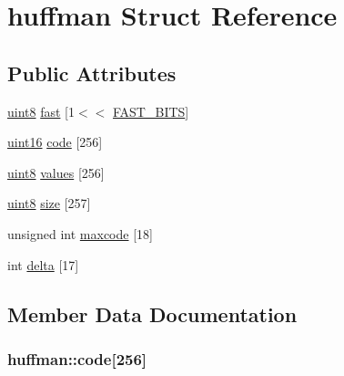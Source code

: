 \hypertarget{structhuffman}{}\section{huffman Struct Reference}
\label{structhuffman}
\subsection*{Public Attributes}
\begin{DoxyCompactItemize}
\item 
\hyperlink{stb__image_8c_adde6aaee8457bee49c2a92621fe22b79}{uint8} \hyperlink{structhuffman_a9dbb29a8ed724a32f502d9595510ddc2}{fast} \mbox{[}1$<$$<$ \hyperlink{stb__image_8c_add78822c51f4692289f2ce174bdf82b0}{F\+A\+S\+T\+\_\+\+B\+I\+T\+S}\mbox{]}
\item 
\hyperlink{stb__image_8c_a05f6b0ae8f6a6e135b0e290c25fe0e4e}{uint16} \hyperlink{structhuffman_a9925018a95d5a2122cd732561fa0fa64}{code} \mbox{[}256\mbox{]}
\item 
\hyperlink{stb__image_8c_adde6aaee8457bee49c2a92621fe22b79}{uint8} \hyperlink{structhuffman_a313d78cf23f40b314c25681ff2a6224b}{values} \mbox{[}256\mbox{]}
\item 
\hyperlink{stb__image_8c_adde6aaee8457bee49c2a92621fe22b79}{uint8} \hyperlink{structhuffman_afdb0fbcf25aec42ba30b0d0e2453a057}{size} \mbox{[}257\mbox{]}
\item 
unsigned int \hyperlink{structhuffman_aeb78aca6c7377faaad8123566d54fc98}{maxcode} \mbox{[}18\mbox{]}
\item 
int \hyperlink{structhuffman_a04255e3e1c6de74d36a08a1aa4e9537d}{delta} \mbox{[}17\mbox{]}
\end{DoxyCompactItemize}


\subsection{Member Data Documentation}
\hypertarget{structhuffman_a9925018a95d5a2122cd732561fa0fa64}{}
\subsubsection[{code}]{ huffman\+::code\mbox{[}256\mbox{]}}\label{structhuffman_a9925018a95d5a2122cd732561fa0fa64}
\hypertarget{structhuffman_a04255e3e1c6de74d36a08a1aa4e9537d}{}
